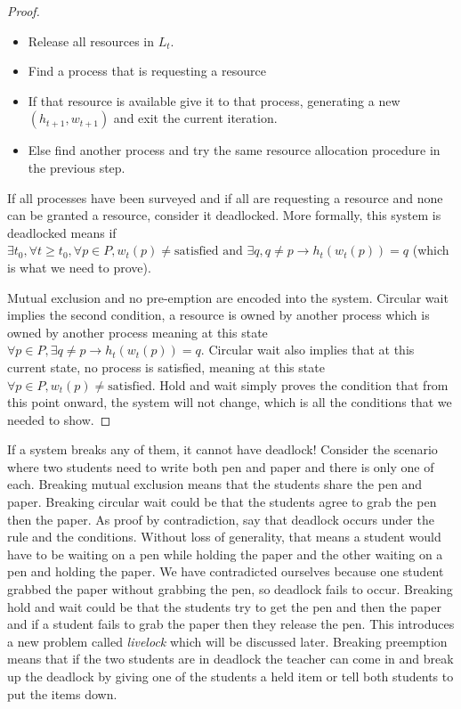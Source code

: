 \begin{proof}
	\begin{itemize}
		\item Release all resources in $L_t$.
		\item Find a process that is requesting a resource
		\item If that resource is available give it to that process, generating a new $(h_{t+1}, w_{t+1})$ and exit the current iteration.
		\item Else find another process and try the same resource allocation procedure in the previous step.
	\end{itemize}
	
	If all processes have been surveyed and if all are requesting a resource and none can be granted a resource, consider it deadlocked.
	More formally, this system is deadlocked means if $\exists t_0, \forall t \geq t_0, \forall p \in P, w_t(p) \neq \text{satisfied} \text{ and } \exists q, q \neq p \rightarrow h_t(w_t(p)) = q$ (which is what we need to prove).
	
	Mutual exclusion and no pre-emption are encoded into the system.
	Circular wait implies the second condition, a resource is owned by another process which is owned by another process meaning at this state $\forall p \in P, \exists q \neq p \rightarrow h_t(w_t(p)) = q$.
	Circular wait also implies that at this current state, no process is satisfied, meaning at this state $\forall p \in P, w_t(p) \neq \text{satisfied}$.
	Hold and wait simply proves the condition that from this point onward, the system will not change, which is all the conditions that we needed to show.
\end{proof}

If a system breaks any of them, it cannot have deadlock!
Consider the scenario where two students need to write both pen and paper and there is only one of each.
Breaking mutual exclusion means that the students share the pen and paper.
Breaking circular wait could be that the students agree to grab the pen then the paper.
As proof by contradiction, say that deadlock occurs under the rule and the conditions.
Without loss of generality, that means a student would have to be waiting on a pen while holding the paper and the other waiting on a pen and holding the paper.
We have contradicted ourselves because one student grabbed the paper without grabbing the pen, so deadlock fails to occur.
Breaking hold and wait could be that the students try to get the pen and then the paper and if a student fails to grab the paper then they release the pen.
This introduces a new problem called \textit{livelock} which will be discussed later.
Breaking preemption means that if the two students are in deadlock the teacher can come in and break up the deadlock by giving one of the students a held item or tell both students to put the items down.

